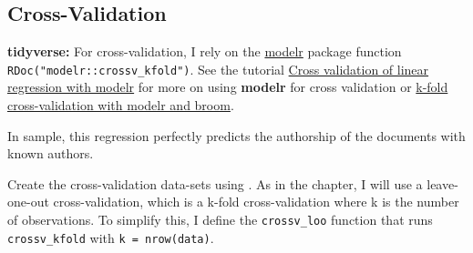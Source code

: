\documentclass[]{book}
\newenvironment{Shaded}{\begin{snugshade}}{\end{snugshade}}
\newcommand{\CommentTok}[1]{\textcolor[rgb]{0.56,0.35,0.01}{\textit{#1}}}
\newcommand{\ControlFlowTok}[1]{\textcolor[rgb]{0.13,0.29,0.53}{\textbf{#1}}}
\newcommand{\DataTypeTok}[1]{\textcolor[rgb]{0.13,0.29,0.53}{#1}}
\newcommand{\KeywordTok}[1]{\textcolor[rgb]{0.13,0.29,0.53}{\textbf{#1}}}
\newcommand{\NormalTok}[1]{#1}
\newcommand{\OperatorTok}[1]{\textcolor[rgb]{0.81,0.36,0.00}{\textbf{#1}}}
\newcommand{\StringTok}[1]{\textcolor[rgb]{0.31,0.60,0.02}{#1}}
\theoremstyle{definition}
\theoremstyle{definition}
\theoremstyle{definition}
\theoremstyle{remark}
\begin{document}
\hypertarget{cross-validation}{%
\subsection{Cross-Validation}\label{cross-validation}}

\textbf{tidyverse:} For cross-validation, I rely on the
\href{https://cran.r-project.org/package=modelr}{modelr} package
function \texttt{RDoc("modelr::crossv\_kfold")}. See the tutorial
\href{https://rpubs.com/dgrtwo/cv-modelr}{Cross validation of linear
regression with modelr} for more on using \textbf{modelr} for cross
validation or
\href{https://drsimonj.svbtle.com/k-fold-cross-validation-with-modelr-and-broom}{k-fold
cross-validation with modelr and broom}.

In sample, this regression perfectly predicts the authorship of the
documents with known authors.

\begin{Shaded}
\end{Shaded}

Create the cross-validation data-sets using . As in the chapter, I will
use a leave-one-out cross-validation, which is a k-fold cross-validation
where k is the number of observations. To simplify this, I define the
\texttt{crossv\_loo} function that runs \texttt{crossv\_kfold} with
\texttt{k\ =\ nrow(data)}.

\begin{Shaded}
\end{Shaded}
\end{document}
